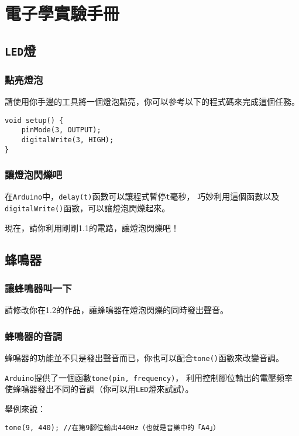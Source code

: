 \documentclass[12pt,a4paper]{article}
\begin{document}


\section{電子學實驗手冊}

\subsection{\texttt{LED}燈}

\subsubsection{點亮燈泡}
請使用你手邊的工具將一個燈泡點亮，你可以參考以下的程式碼來完成這個任務。
\begin{lstlisting}
void setup() {
    pinMode(3, OUTPUT);
    digitalWrite(3, HIGH);
}
\end{lstlisting}

\subsubsection{讓燈泡閃爍吧}
在\texttt{Arduino}中，\texttt{delay(t)}函數可以讓程式暫停\texttt{t}毫秒，
巧妙利用這個函數以及\texttt{digitalWrite()}函數，可以讓燈泡閃爍起來。

現在，請你利用剛剛1.1的電路，讓燈泡閃爍吧！

\subsection{蜂鳴器}

\subsubsection{讓蜂鳴器叫一下}
請修改你在1.2的作品，讓蜂鳴器在燈泡閃爍的同時發出聲音。

\subsubsection{蜂鳴器的音調}
蜂鳴器的功能並不只是發出聲音而已，你也可以配合\texttt{tone()}函數來改變音調。

\texttt{Arduino}提供了一個函數\texttt{tone(pin, frequency)}，
利用控制腳位輸出的電壓頻率使蜂鳴器發出不同的音調（你可以用\texttt{LED}燈來試試）。

舉例來說：
\begin{lstlisting}
tone(9, 440); //在第9腳位輸出440Hz（也就是音樂中的「A4」）
\end{lstlisting}
\end{document}
